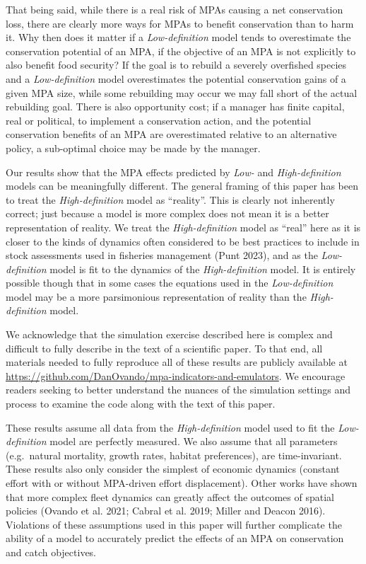 \documentclass[
  default,
  lineno,
  referee]{sn-jnl}
\begin{document}
That being said, while there is a real risk of MPAs causing a net
conservation loss, there are clearly more ways for MPAs to benefit
conservation than to harm it. Why then does it matter if a
\emph{Low-definition} model tends to overestimate the conservation
potential of an MPA, if the objective of an MPA is not explicitly to
also benefit food security? If the goal is to rebuild a severely
overfished species and a \emph{Low-definition} model overestimates the
potential conservation gains of a given MPA size, while some rebuilding
may occur we may fall short of the actual rebuilding goal. There is also
opportunity cost; if a manager has finite capital, real or political, to
implement a conservation action, and the potential conservation benefits
of an MPA are overestimated relative to an alternative policy, a
sub-optimal choice may be made by the manager.

Our results show that the MPA effects predicted by \emph{Low-} and
\emph{High-definition} models can be meaningfully different. The general
framing of this paper has been to treat the \emph{High-definition} model
as ``reality''. This is clearly not inherently correct; just because a
model is more complex does not mean it is a better representation of
reality. We treat the \emph{High-definition} model as ``real'' here as
it is closer to the kinds of dynamics often considered to be best
practices to include in stock assessments used in fisheries management
(Punt 2023), and as the \emph{Low-definition} model is fit to the
dynamics of the \emph{High-definition} model. It is entirely possible
though that in some cases the equations used in the
\emph{Low-definition} model may be a more parsimonious representation of
reality than the \emph{High-definition} model.

We acknowledge that the simulation exercise described here is complex
and difficult to fully describe in the text of a scientific paper. To
that end, all materials needed to fully reproduce all of these results
are publicly available at
\url{https://github.com/DanOvando/mpa-indicators-and-emulators}. We
encourage readers seeking to better understand the nuances of the
simulation settings and process to examine the code along with the text
of this paper.

These results assume all data from the \emph{High-definition} model used
to fit the \emph{Low-definition} model are perfectly measured. We also
assume that all parameters (e.g.~natural mortality, growth rates,
habitat preferences), are time-invariant. These results also only
consider the simplest of economic dynamics (constant effort with or
without MPA-driven effort displacement). Other works have shown that
more complex fleet dynamics can greatly affect the outcomes of spatial
policies (Ovando et al. 2021; Cabral et al. 2019; Miller and Deacon
2016). Violations of these assumptions used in this paper will further
complicate the ability of a model to accurately predict the effects of
an MPA on conservation and catch objectives.
\end{document}
